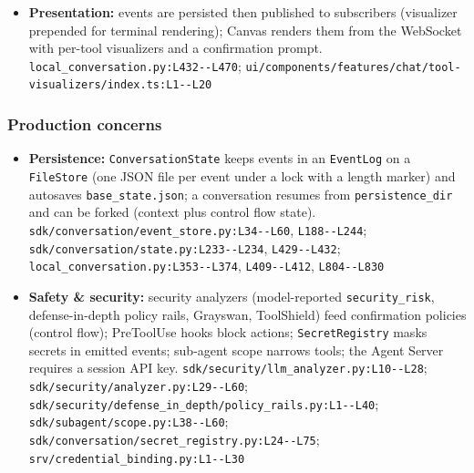 \begin{itemize}
\item \textbf{Presentation:} events are persisted then published to subscribers (visualizer prepended for terminal rendering); Canvas renders them from the WebSocket with per-tool visualizers and a confirmation prompt. \texttt{local\_\allowbreak{}conversation.\allowbreak{}py:\allowbreak{}L432-\allowbreak{}-\allowbreak{}L470}; \texttt{ui/\allowbreak{}components/\allowbreak{}features/\allowbreak{}chat/\allowbreak{}tool-\allowbreak{}visualizers/\allowbreak{}index.\allowbreak{}ts:\allowbreak{}L1-\allowbreak{}-\allowbreak{}L20}
\end{itemize}

\subsubsection*{Production concerns}
\begin{itemize}
\item \textbf{Persistence:} \texttt{ConversationState} keeps events in an \texttt{EventLog} on a \texttt{FileStore} (one JSON file per event under a lock with a length marker) and autosaves \texttt{base\_\allowbreak{}state.\allowbreak{}json}; a conversation resumes from \texttt{persistence\_\allowbreak{}dir} and can be forked (context plus control flow state). \texttt{sdk/\allowbreak{}conversation/\allowbreak{}event\_\allowbreak{}store.\allowbreak{}py:\allowbreak{}L34-\allowbreak{}-\allowbreak{}L60}, \texttt{L188-\allowbreak{}-\allowbreak{}L244}; \texttt{sdk/\allowbreak{}conversation/\allowbreak{}state.\allowbreak{}py:\allowbreak{}L233-\allowbreak{}-\allowbreak{}L234}, \texttt{L429-\allowbreak{}-\allowbreak{}L432}; \texttt{local\_\allowbreak{}conversation.\allowbreak{}py:\allowbreak{}L353-\allowbreak{}-\allowbreak{}L374}, \texttt{L409-\allowbreak{}-\allowbreak{}L412}, \texttt{L804-\allowbreak{}-\allowbreak{}L830}
\item \textbf{Safety \& security:} security analyzers (model-reported \texttt{security\_\allowbreak{}risk}, defense-in-depth policy rails, Grayswan, ToolShield) feed confirmation policies (control flow); PreToolUse hooks block actions; \texttt{SecretRegistry} masks secrets in emitted events; sub-agent scope narrows tools; the Agent Server requires a session API key. \texttt{sdk/\allowbreak{}security/\allowbreak{}llm\_\allowbreak{}analyzer.\allowbreak{}py:\allowbreak{}L10-\allowbreak{}-\allowbreak{}L28}; \texttt{sdk/\allowbreak{}security/\allowbreak{}analyzer.\allowbreak{}py:\allowbreak{}L29-\allowbreak{}-\allowbreak{}L60}; \texttt{sdk/\allowbreak{}security/\allowbreak{}defense\_\allowbreak{}in\_\allowbreak{}depth/\allowbreak{}policy\_\allowbreak{}rails.\allowbreak{}py:\allowbreak{}L1-\allowbreak{}-\allowbreak{}L40}; \texttt{sdk/\allowbreak{}subagent/\allowbreak{}scope.\allowbreak{}py:\allowbreak{}L38-\allowbreak{}-\allowbreak{}L60}; \texttt{sdk/\allowbreak{}conversation/\allowbreak{}secret\_\allowbreak{}registry.\allowbreak{}py:\allowbreak{}L24-\allowbreak{}-\allowbreak{}L75}; \texttt{srv/\allowbreak{}credential\_\allowbreak{}binding.\allowbreak{}py:\allowbreak{}L1-\allowbreak{}-\allowbreak{}L30}

\end{itemize}
